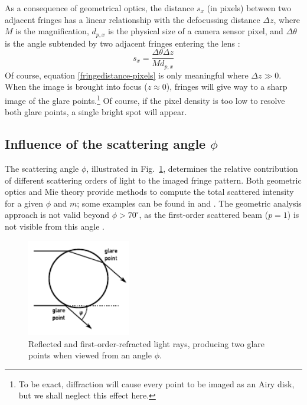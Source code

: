 \documentclass[11.5pt]{book}
\newcommand*{\figref}[1]{Fig.~\ref{#1}}
\begin{document}
As a consequence of geometrical optics, the distance $s_x$ (in pixels) between two
adjacent fringes has a linear relationship with the defocussing distance $\Delta
z$, where $M$ is the magnification, $d_{p,x}$ is the physical size of a
camera sensor pixel, and $\Delta \theta$ is the angle subtended by two adjacent
fringes entering the lens \cite{Pan06}:
\begin{equation}
  s_x = \frac{\Delta \theta \Delta z}{M d_{p,x}} 
  \label{fringedistance-pixels}
\end{equation}
Of course, equation \eqref{fringedistance-pixels} is only meaningful where $\Delta z \gg
0$. When the image is brought into focus ($z\approx 0$), fringes will give way to a sharp
image of the glare points.\footnote{To be exact, diffraction will
cause every point to be imaged as an Airy disk, but we shall neglect
this effect here.} Of course, if the pixel density is too low to resolve
both glare points, a single bright spot will appear. 

\subsection{Influence of the scattering angle $\phi$}
The scattering angle $\phi$, illustrated in \figref{fig:droplet-rays}, determines the
relative contribution of different scattering orders of light to the imaged
fringe pattern. Both geometric optics \cite{Vandehulst12} and Mie theory provide
methods to compute the total scattered intensity for a given $\phi$ and $m$;
some examples can be found in \citet{Kawaguchi02} and \citet{Mounaim99}. The
geometric analysis approach is not valid beyond $\phi > 70^\circ$, as the
first-order scattered beam ($p=1$) is not visible from this angle
\cite{Glover95}.

\begin{figure}
\centering
\includegraphics[width=0.4\textwidth]{img/setup/droplet_rays.pdf}
\caption{Reflected and first-order-refracted light rays, producing two glare
points when viewed from an angle $\phi$. \label{fig:droplet-rays}}
\end{figure}
\end{document}
